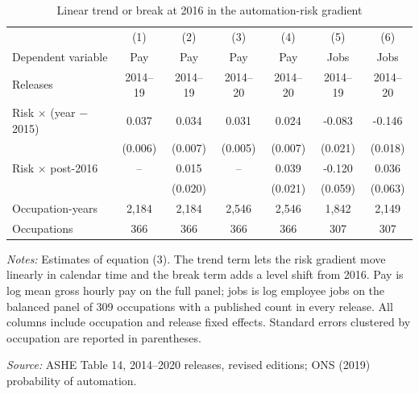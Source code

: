 \begin{table}[!ht]\centering
\caption{Linear trend or break at 2016 in the automation-risk gradient}\label{tab:trend}
\begin{threeparttable}\footnotesize\setlength{\tabcolsep}{3pt}
\begin{tabular}{lcccccc}\toprule
 & (1) & (2) & (3) & (4) & (5) & (6) \\
Dependent variable & Pay & Pay & Pay & Pay & Jobs & Jobs \\
Releases & 2014--19 & 2014--19 & 2014--20 & 2014--20 & 2014--19 & 2014--20 \\ \midrule
Risk $\times$ (year $-$ 2015) & 0.037 & 0.034 & 0.031 & 0.024 & -0.083 & -0.146 \\
 & (0.006) & (0.007) & (0.005) & (0.007) & (0.021) & (0.018) \\
Risk $\times$ post-2016 & -- & 0.015 & -- & 0.039 & -0.120 & 0.036 \\
 &  & (0.020) &  & (0.021) & (0.059) & (0.063) \\ \addlinespace
Occupation-years & 2,184 & 2,184 & 2,546 & 2,546 & 1,842 & 2,149 \\
Occupations & 366 & 366 & 366 & 366 & 307 & 307 \\
\bottomrule\end{tabular}
\begin{tablenotes}\footnotesize
\item \emph{Notes:} Estimates of equation (3). The trend term lets the risk gradient move linearly in calendar time and the break term adds a level shift from 2016. Pay is log mean gross hourly pay on the full panel; jobs is log employee jobs on the balanced panel of 309 occupations with a published count in every release. All columns include occupation and release fixed effects. Standard errors clustered by occupation are reported in parentheses.
\item \emph{Source:} ASHE Table 14, 2014--2020 releases, revised editions; ONS (2019) probability of automation.
\end{tablenotes}\end{threeparttable}\end{table}